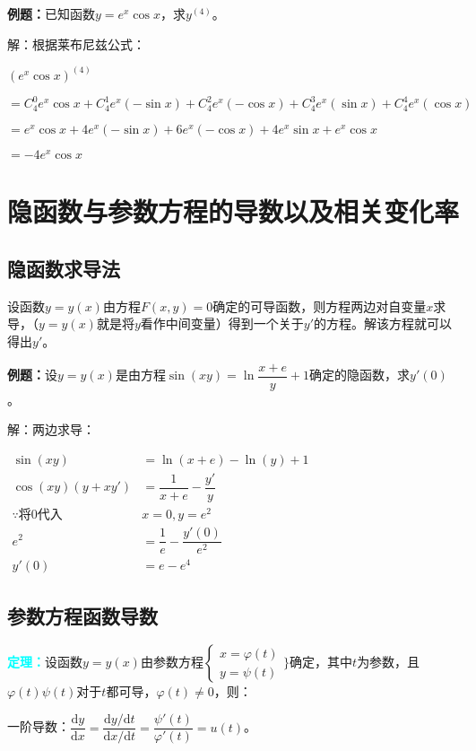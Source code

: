 \documentclass[UTF8, 12pt]{ctexart}
\begin{document}
\textbf{例题：}已知函数$y=e^x\cos x$，求$y^{(4)}$。

解：根据莱布尼兹公式：

$(e^x\cos x)^{(4)}$

$=C_4^0e^x\cos x+C_4^1e^x(-\sin x)+C_4^2e^x(-\cos x)+C_4^3e^x(\sin x)+C_4^4e^x(\cos x)$

$=e^x\cos x+4e^x(-\sin x)+6e^x(-\cos x)+4e^x\sin x+e^x\cos x$

$=-4e^x\cos x$

\section{隐函数与参数方程的导数以及相关变化率}

\subsection{隐函数求导法}

设函数$y=y(x)$由方程$F(x,y)=0$确定的可导函数，则方程两边对自变量$x$求导，（$y=y(x)$就是将$y$看作中间变量）得到一个关于$y'$的方程。解该方程就可以得出$y'$。

\textbf{例题：}设$y=y(x)$是由方程$\sin(xy)=\ln\dfrac{x+e}{y}+1$确定的隐函数，求$y'(0)$。

解：两边求导：

$
\begin{aligned}
    \sin(xy) &=\ln(x+e)-\ln(y)+1 \\
    \cos(xy)(y+xy') &=\dfrac{1}{x+e}-\dfrac{y'}{y} \\
    \because\text{将0代入} & x=0, y=e^2 \\
    e^2&=\dfrac{1}{e}-\dfrac{y'(0)}{e^2} \\
    y'(0) & =e-e^4
\end{aligned}
$

\subsection{参数方程函数导数}

\textcolor{aqua}{\textbf{定理：}}设函数$y=y(x)$由参数方程$\left\{
    \begin{array}{l}
        x=\varphi(t) \\
        y=\psi(t)
    \end{array}
\}\right.$确定，其中$t$为参数，且$\varphi(t)\psi(t)$对于$t$都可导，$\varphi(t)\neq 0$，则：

\medskip

一阶导数：$\dfrac{\textrm{d}y}{\textrm{d}x}=\dfrac{\textrm{d}y/\textrm{d}t}{\textrm{d}x/\textrm{d}t}=\dfrac{\psi'(t)}{\varphi'(t)}=u(t)$。
\end{document}
